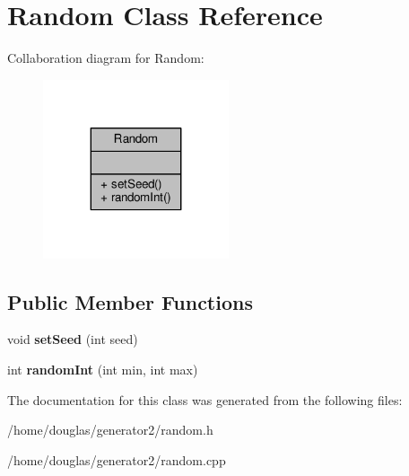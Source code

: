 \hypertarget{classRandom}{}\section{Random Class Reference}
\label{classRandom}


Collaboration diagram for Random\+:
\nopagebreak
\begin{figure}[H]
\begin{center}
\leavevmode
\includegraphics[width=155pt]{classRandom__coll__graph}
\end{center}
\end{figure}
\subsection*{Public Member Functions}
\begin{DoxyCompactItemize}
\item 
void {\bfseries set\+Seed} (int seed)\hypertarget{classRandom_a84f6d30f1cf64ef0cfe6d4ddd60269e9}{}\label{classRandom_a84f6d30f1cf64ef0cfe6d4ddd60269e9}

\item 
int {\bfseries random\+Int} (int min, int max)\hypertarget{classRandom_a6a9dfc13b6af6788018738bb132656c7}{}\label{classRandom_a6a9dfc13b6af6788018738bb132656c7}

\end{DoxyCompactItemize}


The documentation for this class was generated from the following files\+:\begin{DoxyCompactItemize}
\item 
/home/douglas/generator2/random.\+h\item 
/home/douglas/generator2/random.\+cpp\end{DoxyCompactItemize}
